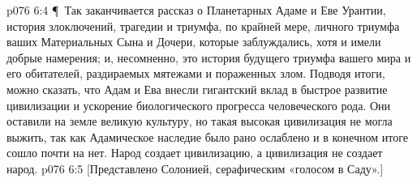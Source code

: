 \vs p076 6:4 \P\ Так заканчивается рассказ о Планетарных Адаме и Еве Урантии, история злоключений, трагедии и триумфа, по крайней мере, личного триумфа ваших Материальных Сына и Дочери, которые заблуждались, хотя и имели добрые намерения; и, несомненно, это история будущего триумфа вашего мира и его обитателей, раздираемых мятежами и пораженных злом. Подводя итоги, можно сказать, что Адам и Ева внесли гигантский вклад в быстрое развитие цивилизации и ускорение биологического прогресса человеческого рода. Они оставили на земле великую культуру, но такая высокая цивилизация не могла выжить, так как Адамическое наследие было рано ослаблено и в конечном итоге сошло почти на нет. Народ создает цивилизацию, а цивилизация не создает народ.
\vs p076 6:5 [Представлено Солонией, серафическим «голосом в Саду».]
